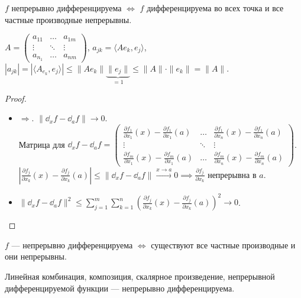 \begin{theorem}
    $f$ непрерывно дифференцируема  $\iff$  $f$ дифференцируема во всех точка и все частные производные непрерывны. 
\end{theorem}
\begin{remark}
    $A = \begin{pmatrix} a_{11} & \ldots & a_{1m}\\ \vdots & \ddots & \vdots \\ a_{n_1} & \ldots & a_{nm} \end{pmatrix}$, $a_{jk} = \langle Ae_k, e_j \rangle$,  $|a_{jk}| = |\langle A_{e_k}, e_j \rangle| \le \|Ae_k\| \underbrace{\|e_j\|}_{=1} \le \|A\| \cdot \|e_k\| = \|A\|$.
\end{remark}

\begin{proof}
    \begin{itemize}
        \item $\Rightarrow$. $\|\dd_xf - \dd_af\| \to 0$. \\ Матрица для  $\dd_xf - \dd_af = \begin{pmatrix} \frac{\partial f_1}{\partial x_1}(x) - \frac{\partial f_1}{\partial x_1}(a) & \ldots & \frac{\partial f_1}{\partial x_n}(x) - \frac{\partial f_1}{\partial x_n}(a) \\ \vdots & \ddots & \vdots \\ \frac{\partial f_m}{\partial x_1}(x) - \frac{\partial f_m}{\partial x_1}(a) & \ldots & \frac{\partial f_m}{\partial x_n}(x) - \frac{\partial f_m}{\partial x_n}(a) \end{pmatrix}$. $\left|\frac{\partial f_j}{\partial x_k}(x) - \frac{\partial f_j}{\partial x_k}(a)\right| \le \|\dd_xf-\dd_af\| \xrightarrow{x\to a} 0 \implies \frac{\partial f_j}{\partial x_k}$ непрерывна в $a$.
        \item $\|\dd_xf - \dd_af\|^2 \le \sum\limits_{j=1}^m \sum\limits_{k=1}^n \left( \frac{\partial f_j}{\partial x_k}(x) - \frac{\partial f_j}{\partial x_k}(a) \right)^2 \to 0$. 
   \end{itemize} 
\end{proof}
\begin{consequence}
   $f$ --- непрерывно дифференцируема  $\iff$ существуют все частные производные и они непрерывны.
\end{consequence}
\begin{theorem}
    Линейная комбинация, композиция, скалярное произведение, непрерывной дифференцируемой функции --- непрерывно дифференцируема.
\end{theorem}
